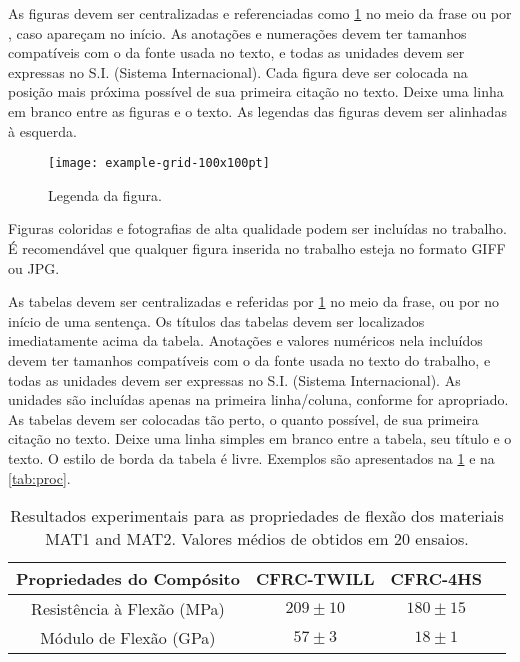 \documentclass[brazilian, fleqn, 10pt]{article}
\begin{document}
As figuras devem ser centralizadas e referenciadas como \cref{fig:firstfig} no meio da frase
ou por , caso apareçam no início. As anotações e numerações devem ter
tamanhos compatíveis com o da fonte usada no texto, e todas as unidades devem
ser expressas no S.I. (Sistema Internacional). Cada figura deve ser colocada na
posição mais próxima possível de sua primeira citação no texto. Deixe uma linha
em branco entre as figuras e o texto. As legendas das figuras devem ser
alinhadas à esquerda.

\begin{figure}[!htbp]
    \medskip
    \centering
    \texttt{[image: example-grid-100x100pt]}
    \caption{Legenda da figura.}
    \label{fig:firstfig}
\end{figure}

Figuras coloridas e fotografias de alta qualidade podem ser incluídas no
trabalho. É recomendável que qualquer figura inserida no trabalho esteja no
formato GIFF ou JPG.

As tabelas devem ser centralizadas e referidas por \cref{tab:flex} no meio da frase, ou
por  no início de uma sentença. Os títulos das tabelas devem ser
localizados imediatamente acima da tabela. Anotações e valores numéricos nela
incluídos devem ter tamanhos compatíveis com o da fonte usada no texto do
trabalho, e todas as unidades devem ser expressas no S.I. (Sistema
Internacional). As unidades são incluídas apenas na primeira linha/coluna,
conforme for apropriado. As tabelas devem ser colocadas tão perto, o quanto
possível, de sua primeira citação no texto. Deixe uma linha simples em branco
entre a tabela, seu título e o texto. O estilo de borda da tabela é livre.
Exemplos são apresentados na \cref{tab:flex} e na \cref{tab:proc}.

\begin{table}[!htp]
    \centering
    \caption{Resultados experimentais para as
    propriedades de flexão dos materiais MAT1 and MAT2. Valores médios de
    obtidos em 20 ensaios.}
    \label{tab:flex}
    \scriptsize
    \begin{tabular}{cccc}\toprule
    Propriedades do Compósito &CFRC-TWILL &CFRC-4HS \\\midrule
    Resistência à Flexão (MPa) &$209 \pm 10$ &$180 \pm 15$ \\
    Módulo de Flexão (GPa) &$57 \pm 3$ &$18 \pm 1$ \\
    \bottomrule
    \end{tabular}
\end{table}
\end{document}
